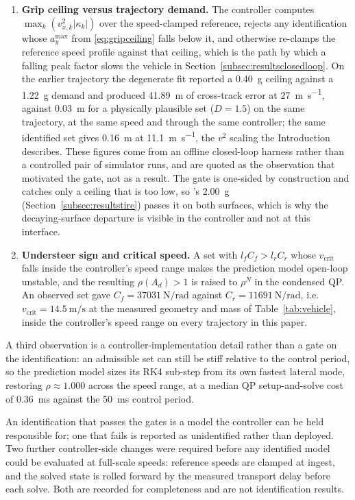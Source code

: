 \begin{enumerate}
\item \textbf{Grip ceiling versus trajectory demand.} The controller computes
$\max_{k}(v_{x,k}^{2}|\kappa_{k}|)$ over the speed-clamped reference, rejects
any identification whose $a_{y}^{\max}$ from \eqref{eq:gripceiling} falls below
it, and otherwise re-clamps the reference speed profile against that ceiling,
which is the path by which a falling peak factor slows the vehicle in
Section~\ref{subsec:resultsclosedloop}. On the earlier trajectory the degenerate
fit reported a \SI{0.40}{\g} ceiling against a \SI{1.22}{\g} demand and produced
\SI{41.89}{\meter} of cross-track error at \SI{27}{\meter\per\second}, against
\SI{0.03}{\meter} for a physically plausible set ($D=\num{1.5}$) on the same
trajectory, at the same speed and through the same controller; the same
identified set gives \SI{0.16}{\meter} at \SI{11.1}{\meter\per\second}, the
$v^{2}$ scaling the Introduction describes. These figures come from an offline
closed-loop harness rather than a controlled pair of simulator runs, and are
quoted as the observation that motivated the gate, not as a result. The gate is
one-sided by construction and catches only a ceiling that is too low, so
\basearm{}'s \SI{2.00}{\g} (Section~\ref{subsec:resultstire}) passes it on both
surfaces, which is why the decaying-surface departure is visible in the
controller and not at this interface.
\item \textbf{Understeer sign and critical speed.} A set with
$l_{f}C_{f}>l_{r}C_{r}$ whose $v_{\mathrm{crit}}$ falls inside the controller's
speed range makes the prediction model open-loop unstable, and the resulting
$\rho(A_{d})>1$ is raised to $\rho^{N}$ in the condensed QP. An observed set
gave $C_{f}=\SI{37031}{\newton\per\radian}$ against
$C_{r}=\SI{11691}{\newton\per\radian}$, i.e.\
$v_{\mathrm{crit}}=\SI{14.5}{\meter\per\second}$ at the measured geometry and
mass of Table~\ref{tab:vehicle}, inside the controller's speed range on every
trajectory in this paper.
\end{enumerate}

A third observation is a controller-implementation detail rather than a gate on
the identification: an admissible set can still be stiff relative to the control
period, so the prediction model sizes its RK4 sub-step from its own fastest
lateral mode, restoring $\rho\approx1.000$ across the speed range, at a median
QP setup-and-solve cost of \SI{0.36}{\milli\second} against the
\SI{50}{\milli\second} control period.


An identification that passes the gates is a model the controller can be held
responsible for; one that fails is reported as unidentified rather than
deployed. Two further controller-side changes were required before any
identified model could be evaluated at full-scale speeds: reference speeds are
clamped at ingest, and the solved state is rolled forward by the measured
transport delay before each solve. Both are recorded for completeness and are
not identification results.
